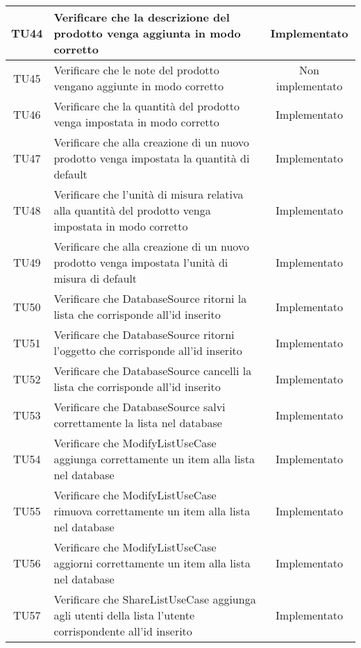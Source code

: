 \begin{center}
\begin{longtable}{|c|>{\centering}m{10cm}|c|}
		TU44 & Verificare che la descrizione del prodotto venga aggiunta in modo corretto & Implementato \\ \hline
		TU45 & Verificare che le note del prodotto vengano aggiunte in modo corretto & Non implementato \\ \hline
		TU46 & Verificare che la quantità del prodotto venga impostata in modo corretto & Implementato \\ \hline
		TU47 & Verificare che alla creazione di un nuovo prodotto venga impostata la quantità di default & Implementato \\ \hline
		TU48 & Verificare che l'unità di misura relativa alla quantità del prodotto venga impostata in modo corretto & Implementato \\ \hline
		TU49 & Verificare che alla creazione di un nuovo prodotto venga impostata l'unità di misura di default & Implementato \\ \hline
		TU50 & Verificare che DatabaseSource ritorni la lista che corrisponde all'id inserito & Implementato \\ \hline
		TU51 & Verificare che DatabaseSource ritorni l'oggetto che corrisponde all'id inserito & Implementato \\ \hline
		TU52 & Verificare che DatabaseSource cancelli la lista che corrisponde all'id inserito & Implementato \\ \hline
		TU53 & Verificare che DatabaseSource salvi correttamente la lista nel database & Implementato \\ \hline
		TU54 & Verificare che ModifyListUseCase aggiunga correttamente un item alla lista nel database & Implementato \\ \hline
		TU55 & Verificare che ModifyListUseCase rimuova correttamente un item alla lista nel database & Implementato \\ \hline
		TU56 & Verificare che ModifyListUseCase aggiorni correttamente un item alla lista nel database & Implementato \\ \hline
		TU57 & Verificare che ShareListUseCase aggiunga agli utenti della lista l’utente corrispondente all’id inserito & Implementato \\ \hline
	\end{longtable}
\end{center}
